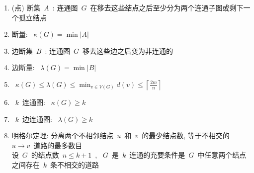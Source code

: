 \documentclass[11pt,a4paper]{article}%
\renewcommand{\[}{~$}
\renewcommand{\]}{$~}%
\begin{document}
\begin{enumerate}
\begin{itemize}
	 	\end{itemize}
	 \item (点) 断集\[A\]: 连通图\[G\]在移去这些结点之后至少分为两个连通子图或剩下一个孤立结点
	 \item 断量: \[\kappa (G) = \min |A|\]
	 \item 边断集\[B\]: 连通图\[G\]移去这些边之后变为非连通的
	 \item 边断量: \[\lambda (G) = \min |B|\]
	 \item \[\kappa (G) \le \lambda (G) \le \min_{v\in V(G)} d(v)\le \left\lceil\frac{2m}{n}\right\rceil\]
	 \item \[k\]连通图: \[\kappa(G)\ge k\]
	 \item \[k\]边连通图: \[\lambda(G) \ge k\]
	 \item 明格尔定理: 分离两个不相邻结点\[u\]和\[v\]的最少结点数, 等于不相交的\[u\to v\]道路的最多数目\\
	 	设\[G\]的结点数\[n\le k+1\], \[G\]是\[k\]连通的充要条件是\[G\]中任意两个结点之间存在\[k\]条不相交的道路
	\end{enumerate}
	
\end{document}
